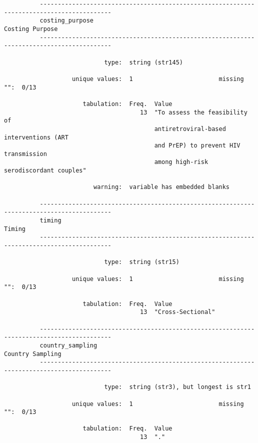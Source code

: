 \documentclass{article}
\begin{document}
\begin{verbatim}
          ------------------------------------------------------------------------------------------
          costing_purpose                                                            Costing Purpose
          ------------------------------------------------------------------------------------------
          
                            type:  string (str145)
          
                   unique values:  1                        missing "":  0/13
          
                      tabulation:  Freq.  Value
                                      13  "To assess the feasibility of
                                          antiretroviral-based interventions (ART
                                          and PrEP) to prevent HIV transmission
                                          among high-risk serodiscordant couples"
          
                         warning:  variable has embedded blanks
          
          ------------------------------------------------------------------------------------------
          timing                                                                              Timing
          ------------------------------------------------------------------------------------------
          
                            type:  string (str15)
          
                   unique values:  1                        missing "":  0/13
          
                      tabulation:  Freq.  Value
                                      13  "Cross-Sectional"
          
          ------------------------------------------------------------------------------------------
          country_sampling                                                          Country Sampling
          ------------------------------------------------------------------------------------------
          
                            type:  string (str3), but longest is str1
          
                   unique values:  1                        missing "":  0/13
          
                      tabulation:  Freq.  Value
                                      13  "."
          

\end{verbatim}
\end{document}
